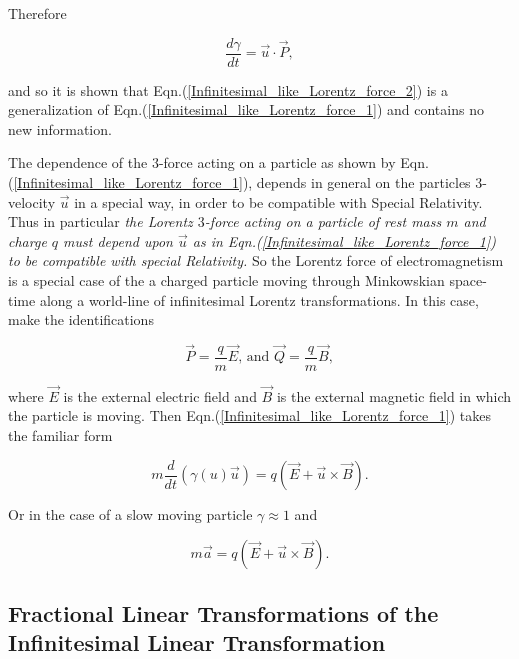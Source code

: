 Therefore

\begin{equation*}
\frac{d\gamma}{dt} =  \vec{u} \cdot \vec{P},
\end{equation*}

and so it is shown that Eqn.(\ref{Infinitesimal_like_Lorentz_force_2}) is a generalization of Eqn.(\ref{Infinitesimal_like_Lorentz_force_1}) and contains no new information. 

The dependence of the $3$-force acting on a particle as shown by Eqn.(\ref{Infinitesimal_like_Lorentz_force_1}), depends in general on the particles $3$-velocity $\vec{u}$ in a special way, in order to be compatible with Special Relativity. Thus in particular \textit{the Lorentz $3$-force acting on a particle of rest mass $m$ and charge $q$ must depend upon $\vec{u}$ as in Eqn.(\ref{Infinitesimal_like_Lorentz_force_1}) to be compatible with special Relativity.} So the Lorentz force of electromagnetism is a special case of the a charged particle moving through Minkowskian space-time along a world-line of infinitesimal Lorentz transformations. In this case, make the identifications

\begin{equation}\label{Infinitesimal_P_Q_interms_E_B} 
\vec{P} = \frac{q}{m} \vec{E} \text{, and  } \vec{Q} = \frac{q}{m}\vec{B},
\end{equation} 

\noindent where $\vec{E}$ is the external electric field and $\vec{B}$ is the external magnetic field in which the particle is moving. Then Eqn.(\ref{Infinitesimal_like_Lorentz_force_1}) takes the familiar form

\begin{equation*}
m \frac{d}{dt} (\gamma(u) \vec{u}) = q(\vec{E} + \vec{u} \times \vec{B}).
\end{equation*}

\noindent Or in the case of a slow moving particle $\gamma \approx 1$ and 

\begin{equation*}  
m \vec{a} = q (\vec{E} + \vec{u} \times \vec{B}).
\end{equation*}  

\subsection{Fractional Linear Transformations of the Infinitesimal Linear Transformation}\label{Infinitesimal_Section_Fractional_Linear}


